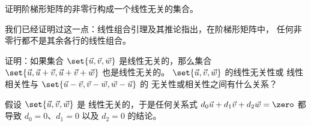 \begin{exercises}
  \recommended \item
    证明阶梯形矩阵的非零行构成一个线性无关的集合。
    \begin{answer}
      我们已经证明过这一点：线性组合引理及其推论指出，在阶梯形矩阵中，
      任何非零行都不是其余各行的线性组合。
    \end{answer}
  \item
     \begin{exparts}
       \partsitem 证明：如果集合 \( \set{\vec{u},\vec{v},\vec{w}} \)
          是线性无关的，那么集合
          \( \set{\vec{u},\vec{u}+\vec{v},\vec{u}+\vec{v}+\vec{w}} \)
          也是线性无关的。
       \partsitem  \( \set{\vec{u},\vec{v},\vec{w}} \) 的线性无关性或
         线性相关性与
         \( \set{\vec{u}-\vec{v},\vec{v}-\vec{w},\vec{w}-\vec{u}} \) 的
         无关性或相关性之间有什么关系？
     \end{exparts}
     \begin{answer}
       \begin{exparts}
         \partsitem 假设
           \( \set{\vec{u},\vec{v},\vec{w}} \) 是
           线性无关的，于是任何关系式
           $d_0\vec{u}+d_1\vec{v}+d_2\vec{w}=\zero$ 都导致
           $d_0=0$、$d_1=0$ 以及 $d_2=0$ 的结论。


\end{exparts}
\end{answer}
\end{exercises}
